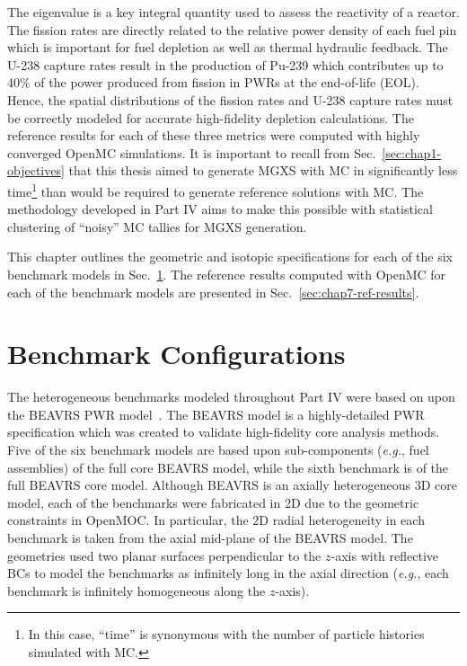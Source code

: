 The eigenvalue is a key integral quantity used to assess the reactivity of a reactor. The fission rates are directly related to the relative power density of each fuel pin which is important for fuel depletion as well as thermal hydraulic feedback. The U-238 capture rates result in the production of Pu-239 which contributes up to 40\% of the power produced from fission in \ac{PWR}s at the end-of-life (EOL). Hence, the spatial distributions of the fission rates and U-238 capture rates must be correctly modeled for accurate high-fidelity depletion calculations. The reference results for each of these three metrics were computed with highly converged OpenMC simulations. It is important to recall from Sec.~\ref{sec:chap1-objectives} that this thesis aimed to generate \ac{MGXS} with \ac{MC} in significantly less time\footnote{In this case, ``time'' is synonymous with the number of particle histories simulated with \ac{MC}.} than would be required to generate reference solutions with \ac{MC}. The methodology developed in Part IV aims to make this possible with statistical clustering of ``noisy'' \ac{MC} tallies for \ac{MGXS} generation.

This chapter outlines the geometric and isotopic specifications for each of the six benchmark models in Sec.~\ref{sec:chap7-benchmarks}. The reference results computed with OpenMC for each of the benchmark models are presented in Sec.~\ref{sec:chap7-ref-results}.


\section{Benchmark Configurations}
\label{sec:chap7-benchmarks}

The heterogeneous benchmarks modeled throughout Part IV were based on upon the \ac{BEAVRS} \ac{PWR} model~\cite{horelik2013beavrs}. The \ac{BEAVRS} model is a highly-detailed \ac{PWR} specification which was created to validate high-fidelity core analysis methods. Five of the six benchmark models are based upon sub-components (\textit{e.g.}, fuel assemblies) of the full core \ac{BEAVRS} model, while the sixth benchmark is of the full \ac{BEAVRS} core model. Although \ac{BEAVRS} is an axially heterogeneous 3D core model, each of the benchmarks were fabricated in 2D due to the geometric constraints in OpenMOC. In particular, the 2D radial heterogeneity in each benchmark is taken from the axial mid-plane of the \ac{BEAVRS} model. The geometries used two planar surfaces perpendicular to the $z$-axis with reflective \acp{BC} to model the benchmarks as infinitely long in the axial direction (\textit{e.g.}, each benchmark is infinitely homogeneous along the $z$-axis).

